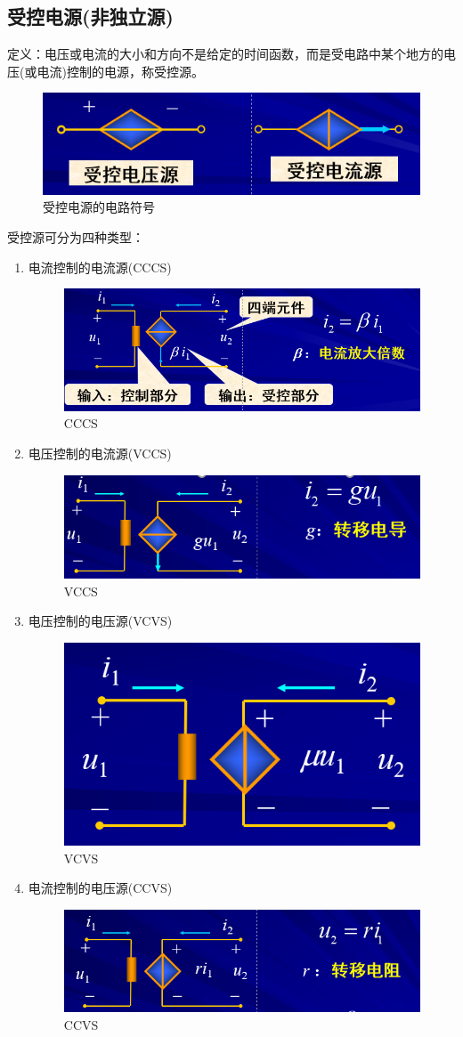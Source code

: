 \documentclass[11pt,a4paper,oneside]{book}
\begin{document}
\subsection{受控电源(非独立源)}
定义：电压或电流的大小和方向不是给定的时间函数，而是受电路中某个地方的电压(或电流)控制的电源，称受控源。
\begin{figure}[H]
	\centering
	\includegraphics[width=0.4\linewidth]{screenshot120}
	\caption{受控电源的电路符号}
	\label{fig:screenshot120}
\end{figure}
受控源可分为四种类型：
\begin{enumerate}
	\item 电流控制的电流源(CCCS)
	
	\begin{figure}[h]
		\centering
		\includegraphics[width=0.5\linewidth]{screenshot121}
		\caption{CCCS}
		\label{fig:screenshot121}
	\end{figure}
	\item 电压控制的电流源(VCCS)
	\begin{figure}[H]
		\centering
		\includegraphics[width=0.5\linewidth]{screenshot122}
		\caption{VCCS}
		\label{fig:screenshot122}
	\end{figure}
	\item 电压控制的电压源(VCVS)\begin{figure}[H]
		\centering
		\includegraphics[width=0.5\linewidth]{screenshot123}
		\caption{VCVS}
		\label{fig:screenshot123}
	\end{figure}
	\item 电流控制的电压源(CCVS)
	\begin{figure}[H]
		\centering
		\includegraphics[width=0.5\linewidth]{screenshot124}
		\caption{CCVS}
		\label{fig:screenshot124}
	\end{figure}
\end{enumerate}
\end{document}
